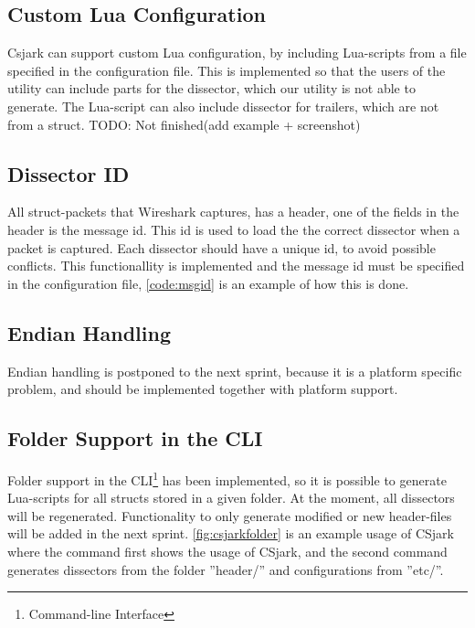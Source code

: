 \subsection{Custom Lua Configuration}
Csjark can support custom Lua configuration, by including Lua-scripts from a file specified in the configuration file. This is implemented so that the users of the utility can include parts for the dissector, which our utility is not able to generate. The Lua-script can also include dissector for trailers, which are not from a struct.
TODO: Not finished(add example + screenshot)

\subsection{Dissector ID}
All struct-packets that Wireshark captures, has a header, one of the fields in 
the header is the message id. This id is used to load the the correct 
dissector when a packet is captured. Each dissector should have a unique id, 
to avoid possible conflicts. This functionallity is implemented and the 
message id must be specified in the configuration file, \autoref{code:msgid} 
is an example of how this is done.



\subsection{Endian Handling}
Endian handling is postponed to the next sprint, because it is a platform 
specific problem, and should be implemented together with platform support.

\subsection{Folder Support in the CLI}
Folder support in the CLI\footnote{Command-line Interface} has been 
implemented, so it is possible to generate Lua-scripts for all structs stored 
in a given folder. At the moment, all dissectors will be regenerated. 
Functionality to only generate modified or new header-files will be added in 
the next sprint. \autoref{fig:csjarkfolder} is an example usage of CSjark where
the command first shows the usage of CSjark, and the second command 
generates dissectors from the folder ''header/'' and configurations from ''etc/''.

